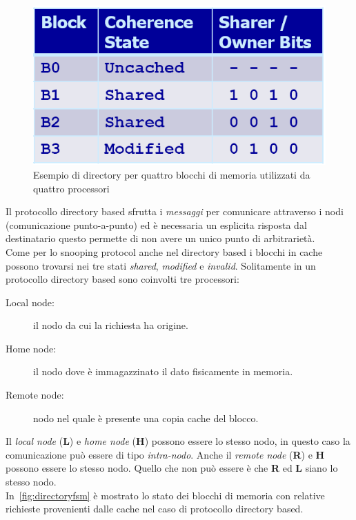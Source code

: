 \begin{figure}[htb]
\includegraphics[scale=0.5]{img/directoryexemp.png}
\caption{Esempio di directory per quattro blocchi di memoria utilizzati da quattro processori}\label{fig:directoryexemp}
\end{figure}
Il protocollo directory based sfrutta i \emph{messaggi} per comunicare attraverso i nodi (comunicazione punto-a-punto) ed è necessaria un esplicita risposta dal destinatario questo permette di non avere un unico punto di arbitrarietà.\\
Come per lo snooping protocol anche nel directory based i blocchi in cache possono trovarsi nei tre stati \emph{shared}, \emph{modified} e \emph{invalid}. Solitamente in un protocollo directory based sono coinvolti tre processori:
\begin{description}
\item[Local node:] il nodo da cui la richiesta ha origine.
\item[Home node:] il nodo dove è immagazzinato il dato fisicamente in memoria.
\item[Remote node:] nodo nel quale è presente una copia cache del blocco.
\end{description}
Il \emph{local node} (\textbf{L}) e \emph{home node} (\textbf{H}) possono essere lo stesso nodo, in questo caso la comunicazione può essere di tipo \emph{intra-nodo}. Anche il \emph{remote node} (\textbf{R}) e \textbf{H} possono essere lo stesso nodo. Quello che non può essere è che \textbf{R} ed \textbf{L} siano lo stesso nodo.\\
In \figurename\,\ref{fig:directoryfsm} è mostrato lo stato dei blocchi di memoria con relative richieste provenienti dalle cache nel caso di protocollo directory based.
